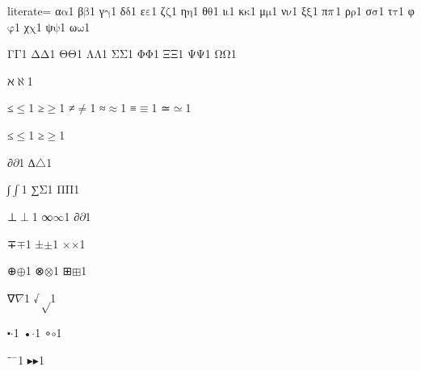 {	%
	literate=
	{α}{{\ensuremath{\mathrm{\alpha}}}}1
	{β}{{\ensuremath{\mathrm{\beta}}}}1
	{γ}{{\ensuremath{\mathrm{\gamma}}}}1
	{δ}{{\ensuremath{\mathrm{\delta}}}}1
	{ε}{{\ensuremath{\mathrm{\varepsilon}}}}1
	{ζ}{{\ensuremath{\mathrm{\zeta}}}}1
	{η}{{\ensuremath{\mathrm{\eta}}}}1
	{θ}{{\ensuremath{\mathrm{\theta}}}}1
	{ι}{{\ensuremath{\mathrm{\iota}}}}1
	{κ}{{\ensuremath{\mathrm{\kappa}}}}1
	{μ}{{\ensuremath{\mathrm{\mu}}}}1
	{ν}{{\ensuremath{\mathrm{\nu}}}}1
	{ξ}{{\ensuremath{\mathrm{\xi}}}}1
	{π}{{\ensuremath{\mathrm{\mathnormal{\pi}}}}}1
	{ρ}{{\ensuremath{\mathrm{\rho}}}}1
	{σ}{{\ensuremath{\mathrm{\sigma}}}}1
	{τ}{{\ensuremath{\mathrm{\tau}}}}1
	{φ}{{\ensuremath{\mathrm{\varphi}}}}1
	{χ}{{\ensuremath{\mathrm{\chi}}}}1
	{ψ}{{\ensuremath{\mathrm{\psi}}}}1
	{ω}{{\ensuremath{\mathrm{\omega}}}}1
	
	{Γ}{{\ensuremath{\mathrm{\Gamma}}}}1
	{Δ}{{\ensuremath{\mathrm{\Delta}}}}1
	{Θ}{{\ensuremath{\mathrm{\Theta}}}}1
	{Λ}{{\ensuremath{\mathrm{\Lambda}}}}1
	{Σ}{{\ensuremath{\mathrm{\Sigma}}}}1
	{Φ}{{\ensuremath{\mathrm{\Phi}}}}1
	{Ξ}{{\ensuremath{\mathrm{\Xi}}}}1
	{Ψ}{{\ensuremath{\mathrm{\Psi}}}}1
	{Ω}{{\ensuremath{\mathrm{\Omega}}}}1
	
	{ℵ}{{\ensuremath{\aleph}}}1
	
	{≤}{{\ensuremath{\leq}}}1
	{≥}{{\ensuremath{\geq}}}1
	{≠}{{\ensuremath{\neq}}}1
	{≈}{{\ensuremath{\approx}}}1
	{≡}{{\ensuremath{\equiv}}}1
	{≃}{{\ensuremath{\simeq}}}1
	
	{≤}{{\ensuremath{\leq}}}1
	{≥}{{\ensuremath{\geq}}}1
	
	{∂}{{\ensuremath{\partial}}}1
	{∆}{{\ensuremath{\triangle}}}1 %
	
	{∫}{{\ensuremath{\int}}}1
	{∑}{{\ensuremath{\mathrm{\Sigma}}}}1
	{Π}{{\ensuremath{\mathrm{\Pi}}}}1
	
	{⊥}{{\ensuremath{\perp}}}1
	{∞}{{\ensuremath{\infty}}}1
	{∂}{{\ensuremath{\partial}}}1
	
	{∓}{{\ensuremath{\mp}}}1
	{±}{{\ensuremath{\pm}}}1
	{×}{{\ensuremath{\times}}}1
	
	{⊕}{{\ensuremath{\oplus}}}1
	{⊗}{{\ensuremath{\otimes}}}1
	{⊞}{{\ensuremath{\boxplus}}}1
	
	{∇}{{\ensuremath{\nabla}}}1
	{√}{{\ensuremath{\sqrt}}}1
	
	{⬝}{{\ensuremath{\cdot}}}1
	{•}{{\ensuremath{\cdot}}}1
	{∘}{{\ensuremath{\circ}}}1
	
	{⁻}{{\ensuremath{^{-}}}}1
	{▸}{{\ensuremath{\blacktriangleright}}}1
	
}
